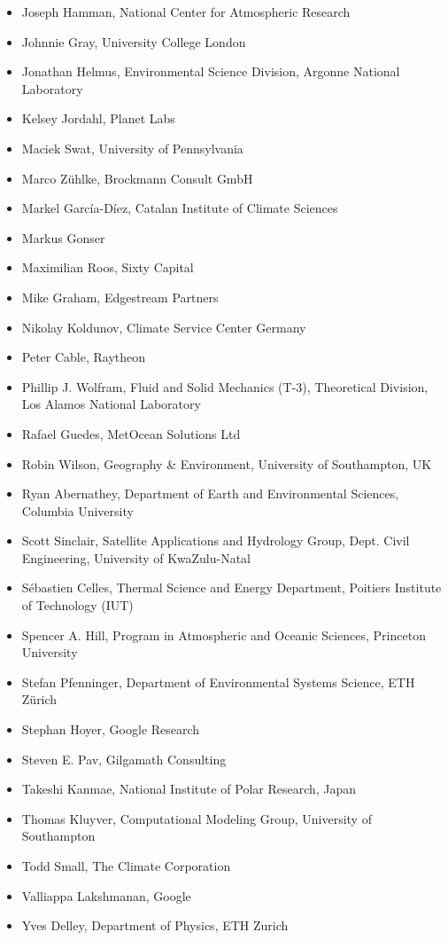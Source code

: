 \documentclass{jors}
\begin{document}
\begin{itemize}
\item Joseph Hamman, National Center for Atmospheric Research
\item Johnnie Gray, University College London
\item Jonathan Helmus, Environmental Science Division, Argonne National Laboratory
\item Kelsey Jordahl, Planet Labs
\item Maciek Swat, University of Pennsylvania
\item Marco Zühlke, Brockmann Consult GmbH
\item Markel García-Díez, Catalan Institute of Climate Sciences
\item Markus Gonser
\item Maximilian Roos, Sixty Capital
\item Mike Graham, Edgestream Partners
\item Nikolay Koldunov, Climate Service Center Germany
\item Peter Cable, Raytheon
\item Phillip J. Wolfram, Fluid and Solid Mechanics (T-3), Theoretical Division, Los Alamos National Laboratory
\item Rafael Guedes, MetOcean Solutions Ltd
\item Robin Wilson, Geography \& Environment, University of Southampton, UK
\item Ryan Abernathey, Department of Earth and Environmental Sciences, Columbia University
\item Scott Sinclair, Satellite Applications and Hydrology Group, Dept. Civil Engineering, University of KwaZulu-Natal
\item S\'ebastien Celles, Thermal Science and Energy Department, Poitiers Institute of Technology (IUT)
\item Spencer A. Hill, Program in Atmospheric and Oceanic Sciences, Princeton University
\item Stefan Pfenninger, Department of Environmental Systems Science, ETH Zürich
\item Stephan Hoyer, Google Research
\item Steven E. Pav, Gilgamath Consulting
\item Takeshi Kanmae, National Institute of Polar Research, Japan
\item Thomas Kluyver, Computational Modeling Group, University of Southampton
\item Todd Small, The Climate Corporation
\item Valliappa Lakshmanan, Google
\item Yves Delley, Department of Physics, ETH Zurich
\end{itemize}
\end{document}
